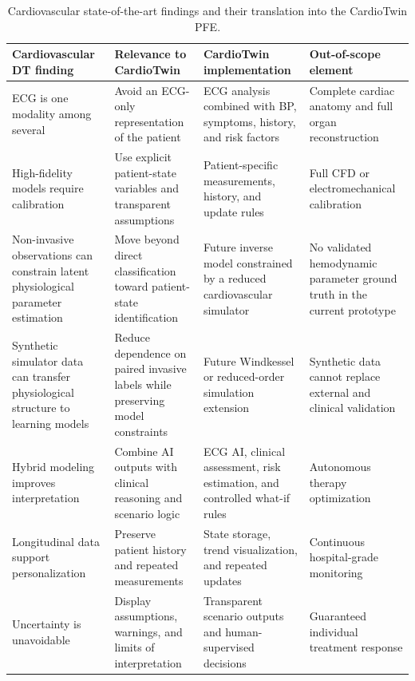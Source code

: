 \begin{table}[H]
\centering
\small
\caption{Cardiovascular state-of-the-art findings and their translation into the CardioTwin PFE.}
\label{tab:cardio_implications_cardiotwin}
\begin{tabularx}{\textwidth}{>{\RaggedRight\arraybackslash}p{3.35cm} >{\RaggedRight\arraybackslash}p{3.2cm} >{\RaggedRight\arraybackslash}p{3.55cm} >{\RaggedRight\arraybackslash}X}
\toprule
\textbf{Cardiovascular DT finding} & \textbf{Relevance to CardioTwin} & \textbf{CardioTwin implementation} & \textbf{Out-of-scope element}\\
\midrule
ECG is one modality among several & Avoid an ECG-only representation of the patient & ECG analysis combined with BP, symptoms, history, and risk factors & Complete cardiac anatomy and full organ reconstruction\\
\addlinespace
High-fidelity models require calibration & Use explicit patient-state variables and transparent assumptions & Patient-specific measurements, history, and update rules & Full CFD or electromechanical calibration\\
\addlinespace
Non-invasive observations can constrain latent physiological parameter estimation & Move beyond direct classification toward patient-state identification & Future inverse model constrained by a reduced cardiovascular simulator & No validated hemodynamic parameter ground truth in the current prototype\\
\addlinespace
Synthetic simulator data can transfer physiological structure to learning models & Reduce dependence on paired invasive labels while preserving model constraints & Future Windkessel or reduced-order simulation extension & Synthetic data cannot replace external and clinical validation\\
\addlinespace
Hybrid modeling improves interpretation & Combine AI outputs with clinical reasoning and scenario logic & ECG AI, clinical assessment, risk estimation, and controlled what-if rules & Autonomous therapy optimization\\
\addlinespace
Longitudinal data support personalization & Preserve patient history and repeated measurements & State storage, trend visualization, and repeated updates & Continuous hospital-grade monitoring\\
\addlinespace
Uncertainty is unavoidable & Display assumptions, warnings, and limits of interpretation & Transparent scenario outputs and human-supervised decisions & Guaranteed individual treatment response\\
\bottomrule
\end{tabularx}
\end{table}

